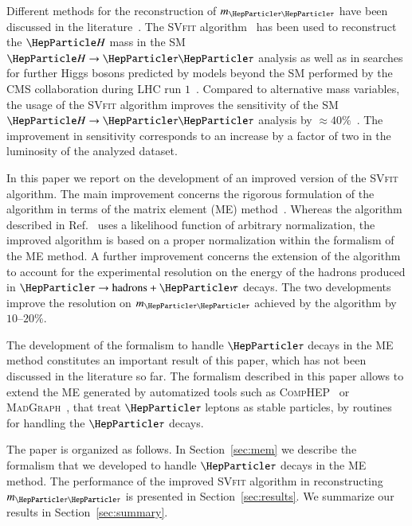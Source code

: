 Different methods for the reconstruction of $m_{\Pgt\Pgt}$ 
have been discussed in the literature~\cite{massRecoCollinearApprox,neutrinoRecByVertexInfo,MMC,Barr:2011he,Gripaios:2012th}. 
The \textsc{SVfit} algorithm~\cite{SVfit} has been used to reconstruct the $\PHiggs$ mass in the SM $\PHiggs \to \Pgt\Pgt$ analysis
as well as in searches for further Higgs bosons predicted by models beyond the SM
performed by the CMS collaboration during LHC run $1$~\cite{HIG-10-002,HIG-11-029,HIG-13-004,HIG-13-021,HIG-14-029,HIG-14-033,HIG-15-001}.
Compared to alternative mass variables,
the usage of the \textsc{SVfit} algorithm improves the sensitivity of the SM $\PHiggs \to \Pgt\Pgt$ analysis by $\approx 40\%$~\cite{HIG-13-004}.
The improvement in sensitivity corresponds to an increase by a factor of two in the luminosity of the analyzed dataset.

In this paper we report on the development of an improved version of the \textsc{SVfit} algorithm.
The main improvement concerns the rigorous formulation of the algorithm in terms of the matrix element (ME) method~\cite{Kondo:1988yd,Kondo:1991dw}.
Whereas the algorithm described in Ref.~\cite{SVfit} uses a likelihood function of arbitrary normalization,
the improved algorithm is based on a proper normalization within the formalism of the ME method.
A further improvement concerns the extension of the algorithm to account for the experimental resolution 
on the energy of the hadrons produced in $\Pgt \to \textrm{hadrons} + \Pnut$ decays.
The two developments improve the resolution on $m_{\Pgt\Pgt}$ achieved by the algorithm by $10$--$20\%$.

The development of the formalism to handle $\Pgt$ decays in the ME method constitutes an important result of this paper,
which has not been discussed in the literature so far.
The formalism described in this paper allows to extend the ME generated by automatized tools such as \textsc{CompHEP}~\cite{CompHEP} or \textsc{MadGraph}~\cite{MadGraph},
that treat $\Pgt$ leptons as stable particles, by routines for handling the $\Pgt$ decays.

The paper is organized as follows. 
In Section~\ref{sec:mem} we describe the formalism that we developed to handle $\Pgt$ decays in the ME method.
The performance of the improved \textsc{SVfit} algorithm in reconstructing $m_{\Pgt\Pgt}$ is presented in Section~\ref{sec:results}.
We summarize our results in Section~\ref{sec:summary}.
